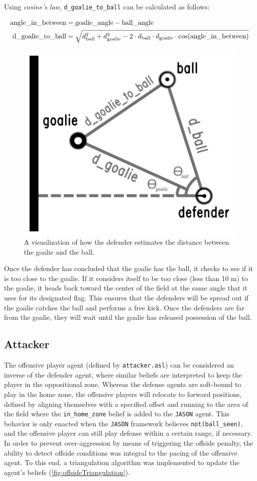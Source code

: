 \documentclass[conference]{IEEEtran}
\begin{document}
Using \textit{cosine's law}, \texttt{d\_goalie\_to\_ball} can be calculated as follows:

\[
\resizebox{\columnwidth}{!}{$
\begin{aligned}
    \text{angle\_in\_between} &= \text{goalie\_angle} - \text{ball\_angle} \\
    \text{d\_goalie\_to\_ball} &= 
    \sqrt{d_{\text{ball}}^2 + d_{\text{goalie}}^2 - 2 \cdot d_{\text{ball}} \cdot d_{\text{goalie}} \cdot \cos(\text{angle\_in\_between})}
\end{aligned}
$}
\]

\begin{figure}[ht!]
    \centering\centerline{\includegraphics[width=.25\textwidth]{Figures/triangulation_defender_goalie.png}}
    \caption{A visualization of how the defender estimates the distance between the goalie and the ball.}
    \label{fig:estimateGoalieDistance}
\end{figure}

Once the defender has concluded that the goalie has the ball, it checks to see if it is too close to the goalie. If it considers itself to be too close (less than 10 m) to the goalie, it heads back toward the center of the field at the same angle that it uses for its designated flag. This ensures that the defenders will be spread out if the goalie catches the ball and performs a free kick. Once the defenders are far from the goalie, they will wait until the goalie has released possession of the ball.

\subsection{Attacker}\label{AA}
The offensive player agent (defined by \texttt{attacker.asl}) can be considered an inverse of the defender agent, where similar beliefs are interpreted to keep the player in the oppositional zone. Whereas the defense agents are soft-bound to play in the home zone, the offensive players will relocate to forward positions, defined by aligning themselves with a specified offset and running to the area of the field where the \texttt{in\_home\_zone} belief is added to the \texttt{JASON} agent. This behavior is only enacted when the \texttt{JASON} framework believes \texttt{not(ball\_seen)}, and the offensive player can still play defense within a certain range, if necessary. In order to prevent over-aggression by means of triggering the offside penalty, the ability to detect offside conditions was integral to the pacing of the offensive agent. To this end, a triangulation algorithm was implemented to update the agent's beliefs (\ref{fig:offsideTriangulation}).
\end{document}
